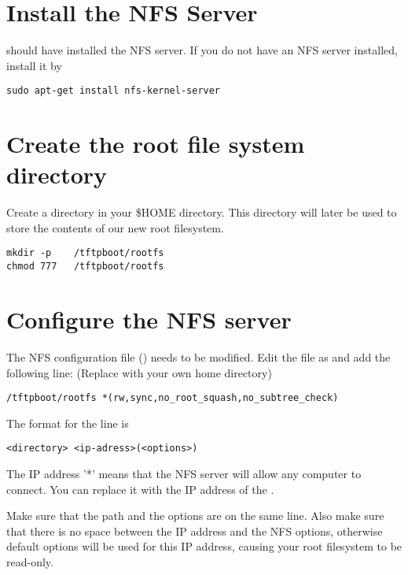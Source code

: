 
\section{Install the NFS Server}

 should have installed the NFS server.
If you do not have an NFS server installed, install it by

\begin{verbatim}
sudo apt-get install nfs-kernel-server
\end{verbatim}

\section{Create the root file system directory}

Create a  directory in your \$HOME directory. This
directory will later be used to store the contents of our new
root filesystem.

\begin{verbatim}
mkdir -p	/tftpboot/rootfs
chmod 777	/tftpboot/rootfs
\end{verbatim}

\section{Configure the NFS server}

The NFS configuration file () needs to be modified.
Edit the file as  and add the following line: (Replace  with your own home directory)

\begin{verbatim}
/tftpboot/rootfs *(rw,sync,no_root_squash,no_subtree_check)
\end{verbatim}

The format for the line is 
\begin{verbatim}
<directory> <ip-adress>(<options>)
\end{verbatim}

The IP address '*' means that the NFS server will allow any computer to connect.
You can replace it with the IP address of the \devboard.

Make sure that the path and the options are on the same line.
Also make sure that there is no space between the IP address and the NFS
options, otherwise default options will be used for this IP address,
causing your root filesystem to be read-only.

